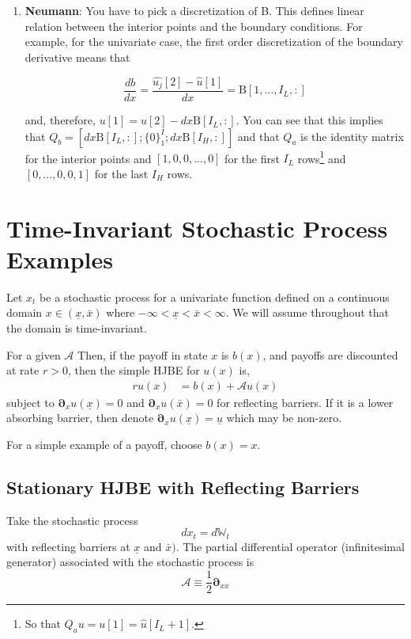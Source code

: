 \documentclass[11pt]{article}
\newcommand{\D}[1][]{\ensuremath{\boldsymbol{\partial}_{#1}}}
\newcommand{\W}{\ensuremath{\mathbb{W}}}
\newcommand{\A}{\ensuremath{\mathcal{A}}}
\begin{document}
\begin{itemize}
\begin{enumerate}
	\item \textbf{Neumann}: You have to pick a discretization of B. 
	This defines linear relation between the interior points and the boundary conditions. For example, for the univariate case, the first order discretization of the boundary derivative means that 
			
	\begin{equation}
		\frac{db}{dx} = \frac{\hat{u_j}[2] - \hat{u}[1]}{dx} = \text{B}[1,\dots,I_{L},:]
	\end{equation}
			
	and, therefore, $u[1] = u[2] - dx\text{B}[I_L,:]$. You can see that this implies that $Q_b = [dx\text{B}[I_L,:];\{0\}_1^I;dx \text{B}[I_H,:]]$ and that $Q_a$ is the identity matrix for the interior points and $[1,0, 0,...,0]$ for the first $I_L$ rows\footnote{So that $Q_a u = u[1] = \hat{u}[I_L+1]$.} and $[0,...,0,0,1]$ for the last $I_H$ rows.%
			
\end{enumerate}
\end{itemize}

\section{Time-Invariant Stochastic Process Examples}
Let $x_t$ be a stochastic process for a univariate function defined on a continuous domain $x \in (\underline{x}, \bar{x})$ where $-\infty < \underline{x} < \bar{x} < \infty$.  We will assume throughout that the domain is time-invariant.

For a given $\A$ Then, if the payoff in state $x$ is $b(x)$, and payoffs are discounted at rate $r > 0$, then the simple HJBE for $u(x)$ is,
\begin{align}
r u(x) &= b(x) + \A u(x)\label{eq:general-stationary-HJBE}
\end{align}
subject to $\D[x]u(\underline{x}) = 0$ and $\D[x]u(\bar{x}) = 0$ for reflecting barriers.  If it is a lower absorbing barrier, then denote $\D[x]u(\underline{x}) = \underline{u}$ which may be non-zero.

For a simple example of a payoff, choose $b(x) = x$.

\subsection{Stationary HJBE with Reflecting Barriers}
Take the stochastic process
$$
d x_t = d \W_t
$$
with reflecting barriers at $\underline{x}$ and $\bar{x})$.  The partial differential operator (infinitesimal generator) associated with the stochastic process is
$$
	\A \equiv \frac{1}{2}\D[xx]
$$
\end{document}
